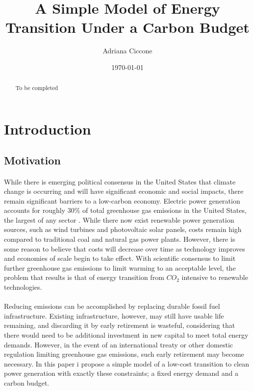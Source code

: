\documentclass{article}
\begin{document}
\title{A Simple Model of Energy Transition Under a Carbon Budget} 
\author{Adriana Ciccone}
\date{\today}

\maketitle


\begin{abstract}
To be completed
\end{abstract}




\section{Introduction}
\subsection{Motivation}

\paragraph{} While there is emerging political consensus in the United States that climate change is occurring and will have significant economic and social impacts, there remain significant barriers to a low-carbon economy. Electric power generation accounts for roughly 30\% of total greenhouse gas emissions in the United States, the largest of any sector \cite{ElectricGHGEmit}. While there now exist renewable power generation sources, such as wind turbines and photovoltaic solar panels, costs remain high compared to traditional coal and natural gas power plants. However, there is some reason to believe that costs will decrease over time as technology improves and economies of scale begin to take effect. With scientific consensus to limit further greenhouse gas emissions to limit warming to an acceptable level, the problem that results is that of energy transition from $CO_2$ intensive to renewable technologies. 

\paragraph{} Reducing emissions can be accomplished by replacing durable fossil fuel infrastructure. Existing infrastructure, however, may still have usable life remaining, and discarding it by early retirement is wasteful, considering that there would need to be additional investment in new capital to meet total energy demands. However, in the event of an international treaty or other domestic regulation limiting greenhouse gas emissions, such early retirement may become necessary. In this paper i propose a simple model of a low-cost transition to clean power generation with exactly these constraints; a fixed energy demand and a carbon budget. 
\end{document}
